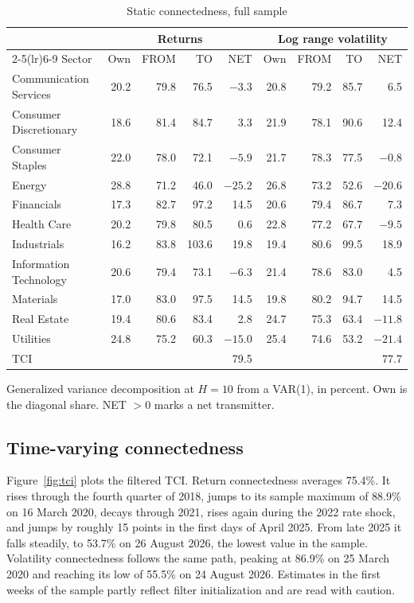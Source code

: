 \documentclass[11pt]{article}
\begin{document}
\begin{table}[H]
\centering
\caption{Static connectedness, full sample}
\label{tab:static}
\small
\begin{tabular}{lrrrrrrrr}
\toprule
& \multicolumn{4}{c}{Returns} & \multicolumn{4}{c}{Log range volatility} \\
\cmidrule(lr){2-5}\cmidrule(lr){6-9}
Sector & Own & FROM & TO & NET & Own & FROM & TO & NET \\
\midrule
Communication Services & 20.2 & 79.8 & 76.5 & $-3.3$ & 20.8 & 79.2 & 85.7 & 6.5 \\
Consumer Discretionary & 18.6 & 81.4 & 84.7 & 3.3 & 21.9 & 78.1 & 90.6 & 12.4 \\
Consumer Staples & 22.0 & 78.0 & 72.1 & $-5.9$ & 21.7 & 78.3 & 77.5 & $-0.8$ \\
Energy & 28.8 & 71.2 & 46.0 & $-25.2$ & 26.8 & 73.2 & 52.6 & $-20.6$ \\
Financials & 17.3 & 82.7 & 97.2 & 14.5 & 20.6 & 79.4 & 86.7 & 7.3 \\
Health Care & 20.2 & 79.8 & 80.5 & 0.6 & 22.8 & 77.2 & 67.7 & $-9.5$ \\
Industrials & 16.2 & 83.8 & 103.6 & 19.8 & 19.4 & 80.6 & 99.5 & 18.9 \\
Information Technology & 20.6 & 79.4 & 73.1 & $-6.3$ & 21.4 & 78.6 & 83.0 & 4.5 \\
Materials & 17.0 & 83.0 & 97.5 & 14.5 & 19.8 & 80.2 & 94.7 & 14.5 \\
Real Estate & 19.4 & 80.6 & 83.4 & 2.8 & 24.7 & 75.3 & 63.4 & $-11.8$ \\
Utilities & 24.8 & 75.2 & 60.3 & $-15.0$ & 25.4 & 74.6 & 53.2 & $-21.4$ \\
\midrule
TCI & \multicolumn{4}{r}{79.5} & \multicolumn{4}{r}{77.7} \\
\bottomrule
\end{tabular}

\smallskip
\parbox{0.95\textwidth}{\footnotesize Generalized variance decomposition at $H=10$ from a VAR(1), in percent. Own is the diagonal share. NET $>0$ marks a net transmitter.}
\end{table}

\subsection{Time-varying connectedness}

Figure~\ref{fig:tci} plots the filtered TCI. Return connectedness averages 75.4\%. It rises through the fourth quarter of 2018, jumps to its sample maximum of 88.9\% on 16 March 2020, decays through 2021, rises again during the 2022 rate shock, and jumps by roughly 15 points in the first days of April 2025. From late 2025 it falls steadily, to 53.7\% on 26 August 2026, the lowest value in the sample. Volatility connectedness follows the same path, peaking at 86.9\% on 25 March 2020 and reaching its low of 55.5\% on 24 August 2026. Estimates in the first weeks of the sample partly reflect filter initialization and are read with caution.
\end{document}
